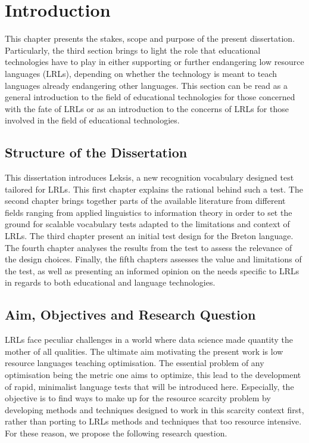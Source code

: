 \chapter{Introduction}    
This chapter presents the stakes, scope and purpose of the present dissertation. Particularly, the third section brings to light the role that educational technologies have to play in either supporting or further endangering low resource languages (LRLs), depending on whether the technology is meant to teach languages already endangering other languages. This section can be read as a general introduction to the field of educational technologies for those concerned with the fate of LRLs or as an introduction to the concerns of LRLs for those involved in the field of educational technologies.

\section{Structure of the Dissertation}
This dissertation introduces Leksis, a new recognition vocabulary designed test tailored for LRLs. This first chapter explains the rational behind such a test. The second chapter brings together parts of the available literature from different fields ranging from applied linguistics to information theory in order to set the ground for scalable vocabulary tests adapted to the limitations and context of LRLs. The third chapter present an initial test design for the Breton language. The fourth chapter analyses the results from the test to assess the relevance of the design choices. Finally, the fifth chapters assesses the value and limitations of the test, as well as presenting an informed opinion on the needs specific to LRLs in regards to both educational and language technologies.

\section{Aim, Objectives and Research Question}
LRLs face peculiar challenges in a world where data science made quantity the mother of all qualities. The ultimate aim motivating the present work is low resource languages teaching optimisation. The essential problem of any optimisation being the metric one aims to optimize, this lead to the development of rapid, minimalist language tests that will be introduced here. Especially, the objective is to find ways to make up for the resource scarcity problem by developing methods and techniques designed to work in this scarcity context first, rather than porting to LRLs methods and techniques that too resource intensive.\\
For these reason, we propose the following research question.

